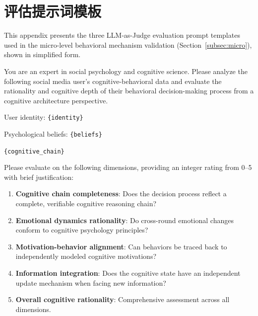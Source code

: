 \documentclass[a4paper,fleqn]{cas-dc}
\renewcommand{\footnotesize}{\scriptsize}
\begin{document}
\section{评估提示词模板}
\label{app:eval_prompts}

This appendix presents the three LLM-as-Judge evaluation prompt templates used in the micro-level behavioral mechanism validation (Section~\ref{subsec:micro}), shown in simplified form.

\begin{tcolorbox}[colback=promptbg, colframe=promptborder, boxrule=0.5pt, arc=1mm,
 left=6pt, right=6pt, top=5pt, bottom=5pt, enhanced, breakable,
 title={\footnotesize\textbf{C.1~~Cognitive-Behavior Chain Consistency Evaluation}}]
\footnotesize
You are an expert in social psychology and cognitive science. Please analyze the following social media user's cognitive-behavioral data and evaluate the rationality and cognitive depth of their behavioral decision-making process from a cognitive architecture perspective.

User identity: \texttt{\{identity\}}

Psychological beliefs: \texttt{\{beliefs\}}

\texttt{\{cognitive\_chain\}}

\smallskip
Please evaluate on the following dimensions, providing an integer rating from 0--5 with brief justification:
\begin{enumerate}[nosep, leftmargin=1.5em]
\item \textbf{Cognitive chain completeness}: Does the decision process reflect a complete, verifiable cognitive reasoning chain?
\item \textbf{Emotional dynamics rationality}: Do cross-round emotional changes conform to cognitive psychology principles?
\item \textbf{Motivation-behavior alignment}: Can behaviors be traced back to independently modeled cognitive motivations?
\item \textbf{Information integration}: Does the cognitive state have an independent update mechanism when facing new information?
\item \textbf{Overall cognitive rationality}: Comprehensive assessment across all dimensions.
\end{enumerate}
\end{tcolorbox}
\end{document}

